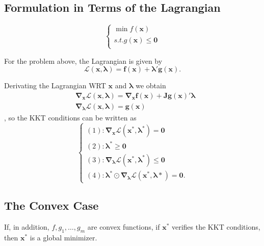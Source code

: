 \subsection{Formulation in Terms of the Lagrangian}
\[
    \left\{\begin{array}{l}
        \min f(\mathbf{x})                 \\
        s.t. g(\mathbf{x}) \leq \mathbf{0} \\
    \end{array}\right.
\]
\begin{definition}
    For the problem above, the Lagrangian is given by \[
        \boldsymbol{\mathcal{L}(\mathbf{x}, \lambda) = f(\mathbf{x}) + \lambda' g(\mathbf{x})}.
    \]

    Derivating the Lagrangian WRT $\mathbf{x}$ and $\boldsymbol{\lambda}$ we obtain \begin{align*}
         & \boldsymbol{\nabla_{\mathbf{x}}\mathcal{L}(\mathbf{x}, \lambda) = \nabla_{\mathbf{x}}f(\mathbf{x})+\mathbf{J}g(\mathbf{x})'\lambda} \\
         & \boldsymbol{\nabla_{\mathbf{\lambda}}\mathcal{L}(\mathbf{x}, \lambda) = g(\mathbf{x})}
    \end{align*}
    , so the KKT conditions can be written as \[
        \left\{\begin{array}{l}
            (1): \boldsymbol{\nabla_{\mathbf{x}}\mathcal{L}(\mathbf{x ^{*}, \lambda ^{*}})} = \mathbf{0} \\
            (2): \boldsymbol{\lambda^* \geq \mathbf{0}}                                                  \\
            (3): \boldsymbol{\nabla_{\lambda}\mathcal{L}(\mathbf{x ^{*}, \lambda ^{*}})\leq 0}           \\
            (4): \boldsymbol{\lambda ^{*} \odot \nabla_{\mathbf{\lambda}}\mathcal{L}(\mathbf{x ^{*}, \lambda*}) = 0.}
        \end{array}\right.
    \]
\end{definition}


\subsection{The Convex Case}

\begin{theorem}
    If, in addition, $f, g_{1}, \dots, g_{m}$ are convex functions, if $\mathbf{x}^{*}$ verifies the KKT conditions, then $\mathbf{x ^{*}}$ is a global minimizer.
\end{theorem}

